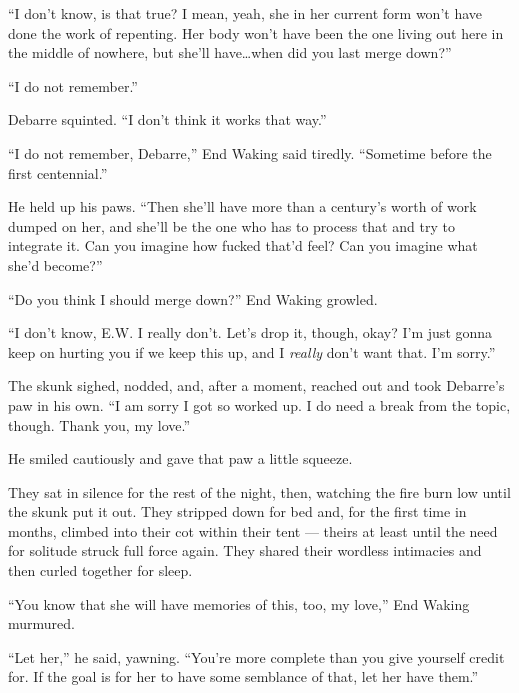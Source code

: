 ``I don't know, is that true? I mean, yeah, she in her current form won't have done the work of repenting. Her body won't have been the one living out here in the middle of nowhere, but she'll have\ldots when did you last merge down?''

``I do not remember.''

Debarre squinted. ``I don't think it works that way.''

``I do not remember, Debarre,'' End Waking said tiredly. ``Sometime before the first centennial.''

He held up his paws. ``Then she'll have more than a century's worth of work dumped on her, and she'll be the one who has to process that and try to integrate it. Can you imagine how fucked that'd feel? Can you imagine what she'd become?''

``Do you think I should merge down?'' End Waking growled.

``I don't know, E.W. I really don't. Let's drop it, though, okay? I'm just gonna keep on hurting you if we keep this up, and I \emph{really} don't want that. I'm sorry.''

The skunk sighed, nodded, and, after a moment, reached out and took Debarre's paw in his own. ``I am sorry I got so worked up. I do need a break from the topic, though. Thank you, my love.''

He smiled cautiously and gave that paw a little squeeze.

They sat in silence for the rest of the night, then, watching the fire burn low until the skunk put it out. They stripped down for bed and, for the first time in months, climbed into their cot within their tent — theirs at least until the need for solitude struck full force again. They shared their wordless intimacies and then curled together for sleep.

``You know that she will have memories of this, too, my love,'' End Waking murmured.

``Let her,'' he said, yawning. ``You're more complete than you give yourself credit for. If the goal is for her to have some semblance of that, let her have them.''
